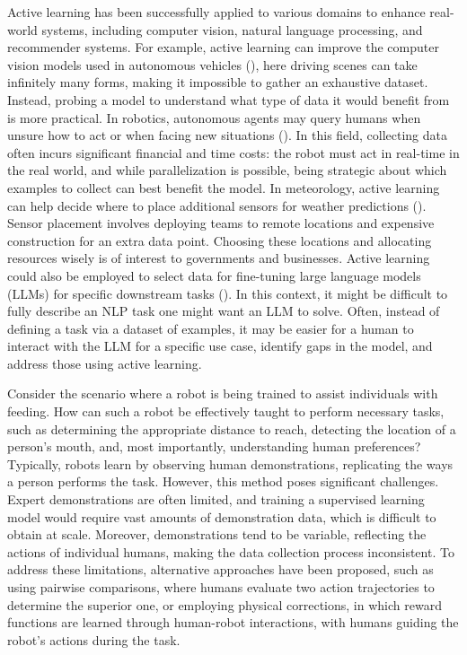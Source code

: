 \documentclass[
  letterpaper,
  numbers=noenddot,
  DIV=11]{scrreprt}
\theoremstyle{definition}
\theoremstyle{plain}
\theoremstyle{plain}
\theoremstyle{remark}
\begin{document}
Active learning has been successfully applied to various domains to
enhance real-world systems, including computer vision, natural language
processing, and recommender systems. For example, active learning can
improve the computer vision models used in autonomous vehicles
(), here driving
scenes can take infinitely many forms, making it impossible to gather an
exhaustive dataset. Instead, probing a model to understand what type of
data it would benefit from is more practical. In robotics, autonomous
agents may query humans when unsure how to act or when facing new
situations (). In this field, collecting data often incurs significant
financial and time costs: the robot must act in real-time in the real
world, and while parallelization is possible, being strategic about
which examples to collect can best benefit the model. In meteorology,
active learning can help decide where to place additional sensors for
weather predictions (). Sensor placement involves deploying teams to remote
locations and expensive construction for an extra data point. Choosing
these locations and allocating resources wisely is of interest to
governments and businesses. Active learning could also be employed to
select data for fine-tuning large language models (LLMs) for specific
downstream tasks (). In
this context, it might be difficult to fully describe an NLP task one
might want an LLM to solve. Often, instead of defining a task via a
dataset of examples, it may be easier for a human to interact with the
LLM for a specific use case, identify gaps in the model, and address
those using active learning.

Consider the scenario where a robot is being trained to assist
individuals with feeding. How can such a robot be effectively taught to
perform necessary tasks, such as determining the appropriate distance to
reach, detecting the location of a person's mouth, and, most
importantly, understanding human preferences? Typically, robots learn by
observing human demonstrations, replicating the ways a person performs
the task. However, this method poses significant challenges. Expert
demonstrations are often limited, and training a supervised learning
model would require vast amounts of demonstration data, which is
difficult to obtain at scale. Moreover, demonstrations tend to be
variable, reflecting the actions of individual humans, making the data
collection process inconsistent. To address these limitations,
alternative approaches have been proposed, such as using pairwise
comparisons, where humans evaluate two action trajectories to determine
the superior one, or employing physical corrections, in which reward
functions are learned through human-robot interactions, with humans
guiding the robot's actions during the task.
\end{document}
